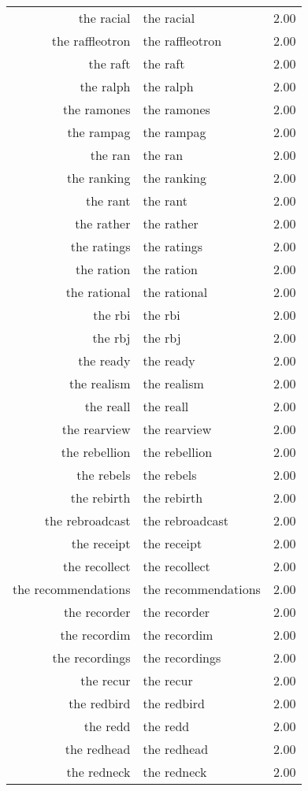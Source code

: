 \begin{table}[ht]
\begin{tabular}{rlr}
  the racial & the racial & 2.00 \\ 
  the raffleotron & the raffleotron & 2.00 \\ 
  the raft & the raft & 2.00 \\ 
  the ralph & the ralph & 2.00 \\ 
  the ramones & the ramones & 2.00 \\ 
  the rampag & the rampag & 2.00 \\ 
  the ran & the ran & 2.00 \\ 
  the ranking & the ranking & 2.00 \\ 
  the rant & the rant & 2.00 \\ 
  the rather & the rather & 2.00 \\ 
  the ratings & the ratings & 2.00 \\ 
  the ration & the ration & 2.00 \\ 
  the rational & the rational & 2.00 \\ 
  the rbi & the rbi & 2.00 \\ 
  the rbj & the rbj & 2.00 \\ 
  the ready & the ready & 2.00 \\ 
  the realism & the realism & 2.00 \\ 
  the reall & the reall & 2.00 \\ 
  the rearview & the rearview & 2.00 \\ 
  the rebellion & the rebellion & 2.00 \\ 
  the rebels & the rebels & 2.00 \\ 
  the rebirth & the rebirth & 2.00 \\ 
  the rebroadcast & the rebroadcast & 2.00 \\ 
  the receipt & the receipt & 2.00 \\ 
  the recollect & the recollect & 2.00 \\ 
  the recommendations & the recommendations & 2.00 \\ 
  the recorder & the recorder & 2.00 \\ 
  the recordim & the recordim & 2.00 \\ 
  the recordings & the recordings & 2.00 \\ 
  the recur & the recur & 2.00 \\ 
  the redbird & the redbird & 2.00 \\ 
  the redd & the redd & 2.00 \\ 
  the redhead & the redhead & 2.00 \\ 
  the redneck & the redneck & 2.00 \\ 

\end{tabular}
\end{table}
